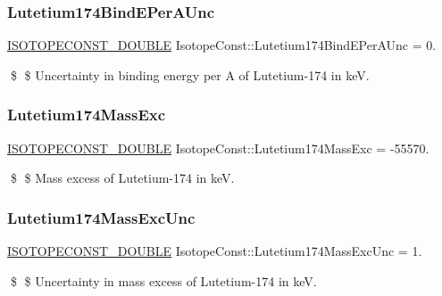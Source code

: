 \subsubsection{\texorpdfstring{Lutetium174\+Bind\+E\+Per\+A\+Unc}{Lutetium174BindEPerAUnc}}
{\footnotesize\ttfamily \mbox{\hyperlink{group___isotope_const-_macros_ga8f45a7272ce02c0b4c65c44636ed719a}{I\+S\+O\+T\+O\+P\+E\+C\+O\+N\+S\+T\+\_\+\+D\+O\+U\+B\+LE}} Isotope\+Const\+::\+Lutetium174\+Bind\+E\+Per\+A\+Unc = 0.}

\$ \$ Uncertainty in binding energy per A of Lutetium-\/174 in keV. \mbox{\label{group___isotope_const-_lutetium-_lu174_ga790823f25b2c3e9efb94654baf3ed092}} 
\subsubsection{\texorpdfstring{Lutetium174\+Mass\+Exc}{Lutetium174MassExc}}
{\footnotesize\ttfamily \mbox{\hyperlink{group___isotope_const-_macros_ga8f45a7272ce02c0b4c65c44636ed719a}{I\+S\+O\+T\+O\+P\+E\+C\+O\+N\+S\+T\+\_\+\+D\+O\+U\+B\+LE}} Isotope\+Const\+::\+Lutetium174\+Mass\+Exc = -\/55570.}

\$ \$ Mass excess of Lutetium-\/174 in keV. \mbox{\label{group___isotope_const-_lutetium-_lu174_ga975ac0ff59ab5cfc9bc0c0e75fdde3d2}} 
\subsubsection{\texorpdfstring{Lutetium174\+Mass\+Exc\+Unc}{Lutetium174MassExcUnc}}
{\footnotesize\ttfamily \mbox{\hyperlink{group___isotope_const-_macros_ga8f45a7272ce02c0b4c65c44636ed719a}{I\+S\+O\+T\+O\+P\+E\+C\+O\+N\+S\+T\+\_\+\+D\+O\+U\+B\+LE}} Isotope\+Const\+::\+Lutetium174\+Mass\+Exc\+Unc = 1.}

\$ \$ Uncertainty in mass excess of Lutetium-\/174 in keV. \mbox{\label{group___isotope_const-_lutetium-_lu174_gaa0ed9a64e0a4ef154d1965099135262c}} 
